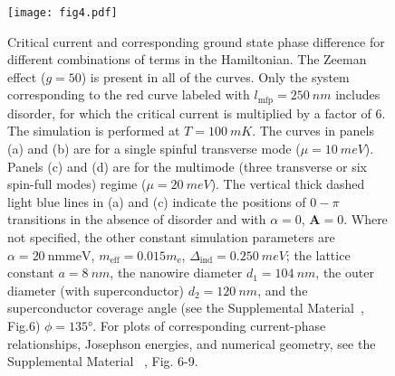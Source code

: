 \documentclass[english, twocolumn, 10pt, aps, superscriptaddress, floatfix, showpacs, prb, citeautoscript]{revtex4-1}
\begin{document}
\begin{figure}[t]
\texttt{[image: fig4.pdf]}
\caption{Critical current and corresponding ground state phase difference for different combinations of terms in the Hamiltonian.
The Zeeman effect ($g=50$) is present in all of the curves.
Only the system corresponding to the red curve labeled with $l_\textrm{mfp}=\SI{250}{nm}$ includes disorder, for which the critical current is multiplied by a factor of 6. The simulation is performed at $T=\SI{100}{mK}$.
The curves in panels (a) and (b) are for a single spinful transverse mode ($\mu=\SI{10}{meV}$).
Panels (c) and (d) are for the multimode (three transverse or six spin-full modes) regime ($\mu=\SI{20}{meV}$).
The vertical thick dashed light blue lines in (a) and (c) indicate the positions of $0-\pi$ transitions in the absence of disorder and with $\alpha = 0$, $\bm{A}=0$.
Where not specified, the other constant simulation parameters are $\alpha=\SI{20}{\nm \meV}$, $m_\textrm{eff}=0.015 m_\textrm{e}$, $\Delta_\textrm{ind}=\SI{0.250}{meV}$; the lattice constant $a=\SI{8}{nm}$, the nanowire diameter $d_1=\SI{104}{nm}$, the outer diameter (with superconductor) $d_2=\SI{120}{nm}$, and the superconductor coverage angle (see the Supplemental Material~\cite{supp}, Fig.6) $\phi=135\si{\degree}$. For plots of corresponding current-phase relationships, Josephson energies, and numerical geometry, see the Supplemental Material ~\cite{supp}, Fig. 6-9.
}
\label{fig:critical_currents}
\end{figure}
\end{document}
